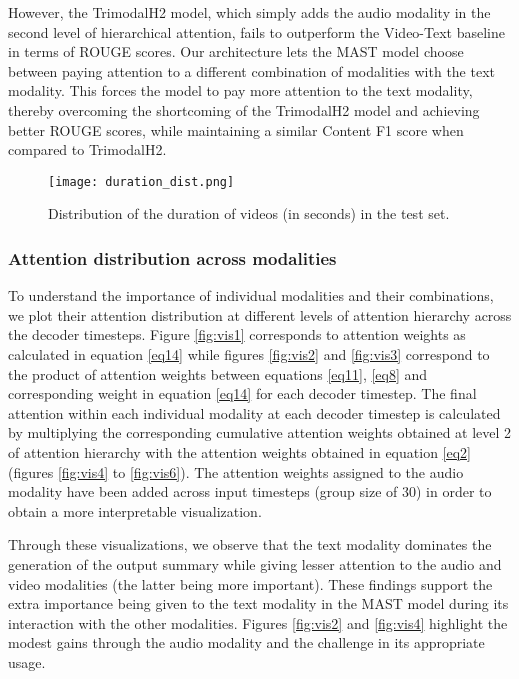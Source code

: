 \documentclass[11pt,a4paper]{article}
\begin{document}
However, the TrimodalH2 model, which simply adds the audio modality in the second level of hierarchical attention, fails to outperform the Video-Text baseline in terms of ROUGE scores. Our architecture lets the MAST model choose between paying attention to a different combination of modalities with the text modality. This forces the model to pay more attention to the text modality, thereby overcoming the shortcoming of the TrimodalH2 model and achieving better ROUGE scores, while maintaining a similar Content F1 score when compared to TrimodalH2.

\begin{figure}
    \centering
    \texttt{[image: duration\_dist.png]}
    \caption{Distribution of the duration of videos (in seconds) in the test set.}
    \label{fig:duration_dist}
    \vspace{-3.5mm}
\end{figure}

\subsubsection{Attention distribution across modalities}
To understand the importance of individual modalities and their combinations, we plot their attention distribution at different levels of attention hierarchy across the decoder timesteps. Figure \ref{fig:vis1} corresponds to attention weights as calculated in equation \ref{eq14} while figures \ref{fig:vis2} and \ref{fig:vis3} correspond to the product of attention weights between equations \ref{eq11}, \ref{eq8} and corresponding weight in equation \ref{eq14} for each decoder timestep. The final attention within each individual modality at each decoder timestep is calculated by multiplying the corresponding cumulative attention weights obtained at level 2 of attention hierarchy with the attention weights obtained in equation \ref{eq2} (figures \ref{fig:vis4} to \ref{fig:vis6}). The attention weights assigned to the audio modality have been added across input timesteps (group size of 30) in order to obtain a more interpretable visualization.

Through these visualizations, we observe that the text modality dominates the generation of the output summary while giving lesser attention to the audio and video modalities (the latter being more important). These findings support the extra importance being given to the text modality in the MAST model during its interaction with the other modalities. Figures \ref{fig:vis2} and \ref{fig:vis4} highlight the modest gains through the audio modality and the challenge in its appropriate usage.
\end{document}
